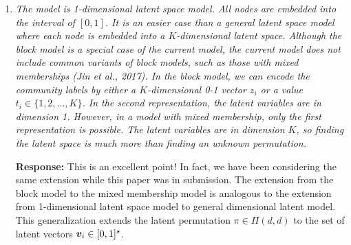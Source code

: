\documentclass[11pt]{article}
\theoremstyle{plain}
\theoremstyle{definition}
\newtheorem{example}{Example}
\begin{document}
\begin{enumerate}[wide, labelwidth=!, labelindent=0pt]
\begin{quote}
{  \begin{example}[Decomposable monotonicity] Let $R\in\mathbb{N}_{+}$ be a constant, and $\{g_{r,i}(\cdot) \colon[0,1]\to \bbR\}$ be a set of 1-d smooth functions for $(r,i)\in[R]\times [m]$. Then, all decomposable smooth functions of the form 
  \[
  f(x_1,\ldots,x_m)=\sum_{r\in[R]}g_{r,1}(x_1)\cdots g_{r,m}(x_m),
  \]
are monotonic-plus-smooth up to permutations. In particular, low-rank tensors with smooth factors are also monotonic-plus-smooth up to permutations.
\end{example}
}
 \end{quote}


\item \textit{
    The model is 1-dimensional latent space model. All nodes are embedded into the interval of $[0, 1]$. It is an easier case than a general latent space model where each node is embedded into a $K$-dimensional latent space. Although the block model is a special case of the current model, the current model does not include common variants of block models, such as those with mixed memberships (Jin et al., 2017).
    In the block model, we can encode the community labels by either a $K$-dimensional 0-1 vector $z_i$ or a value $t_i \in \{1, 2, \ldots , K \}$. In the second representation, the latent variables are in dimension 1. However, in a model with mixed membership, only the first representation is possible. The latent variables are in dimension $K$, so finding the latent space is much more than finding an unknown permutation. }
    
    \textbf{Response:} This is an excellent point! In fact, we have been considering the same extension while this paper was in submission. 
The extension from the block model to the mixed membership model is analogous to the extension from 1-dimensional latent space model to general dimensional latent model. 
    This generalization extends the latent permutation $\pi\in\Pi(d,d)$ to the set of latent vectors $\bm{v}_i\in[0,1]^s$.
    

\end{enumerate}
\end{document}
